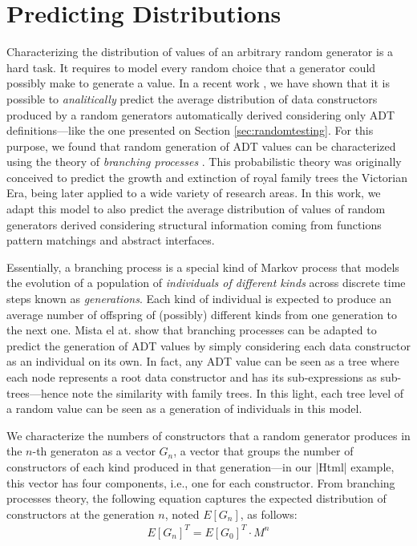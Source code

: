 \section{Predicting Distributions} \label{sec:synthesis}

Characterizing the distribution of values of an arbitrary random generator is a
hard task.
%
It requires to model every random choice that a generator could possibly make to
generate a value.
%
In a recent work \cite{DBLP:conf/haskell/MistaRH18}, we have shown that it is
possible to \emph{analitically} predict the average distribution of data
constructors produced by a random generators automatically derived considering
only ADT definitions---like the one presented on Section
\ref{sec:randomtesting}.
%
For this purpose, we found that random generation of ADT values can be
characterized using the theory of \emph{branching processes} \cite{gw1875}.
%
This probabilistic theory was originally conceived to predict the growth and
extinction of royal family trees the Victorian Era, being later applied to a
wide variety of research areas.
%
In this work, we adapt this model to also predict the average distribution of
values of random generators derived considering structural information coming
from functions pattern matchings and abstract interfaces.

Essentially, a branching process is a special kind of Markov process that models
the evolution of a population of \emph{individuals of different kinds} across
discrete time steps known as \emph{generations}.
%
Each kind of individual is expected to produce an average number of offspring of
(possibly) different kinds from one generation to the next one.
%
Mista el at. \cite{DBLP:conf/haskell/MistaRH18} show that branching processes
can be adapted to predict the generation of ADT values by simply considering
each data constructor as an individual on its own.
%
In fact, any ADT value can be seen as a tree where each node represents a root
data constructor and has its sub-expressions as sub-trees---hence note the
similarity with family trees.
%
In this light, each tree level of a random value can be seen as a generation of
individuals in this model.


We characterize the numbers of constructors that a random generator produces in
the $n$-th generaton as a vector $G_n$, a vector that groups the number of
constructors of each kind produced in that generation---in our |Html| example,
this vector has four components, i.e., one for each constructor.
%
%
From branching processes theory, the following equation captures the expected
distribution of constructors at the generation $n$, noted $E[G_n]$, as follows:
%
\begin{align}
  E[G_n]^T = E[G_0]^T \cdot M^n
  \label{eqn:prediction}
\end{align}

